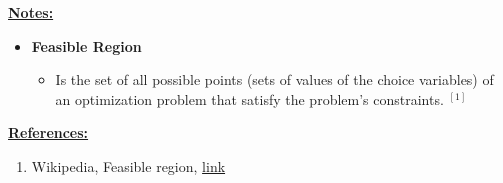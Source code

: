 \documentclass[12pt]{article}
\begin{document}
\begin{enumerate}[1.]














    \bigskip

    \underline{\textbf{Notes:}}

    \bigskip

    \begin{itemize}
        \item \textbf{Feasible Region}

        \begin{itemize}
            \item  Is the set of all possible points (sets of values of the choice variables) of an optimization problem that satisfy the problem's constraints. $^{[1]}$
        \end{itemize}
    \end{itemize}

    \underline{\textbf{References:}}

    \bigskip

    \begin{enumerate}[1)]
        \item Wikipedia, Feasible region, \href{https://en.wikipedia.org/wiki/Feasible_region#:~:text=In%20mathematical%20optimization%2C%20a%20feasible,%2C%20equalities%2C%20and%20integer%20constraints.}{link}
    \end{enumerate}



\end{enumerate}
\end{document}
